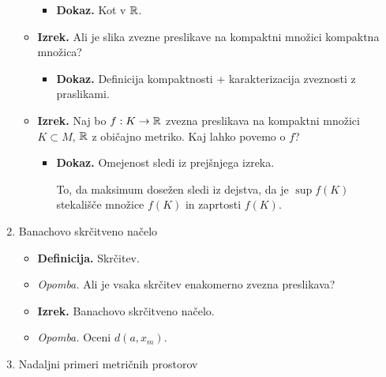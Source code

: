 \begin{enumerate}
\begin{itemize}
\begin{itemize}
            \item \colorbox{green!30}{\textbf{Dokaz.}} Kot v $\mathbb{R}$.
        \end{itemize}        
        \item \colorbox{blue!30}{\textbf{Izrek.}} Ali je slika zvezne preslikave na kompaktni množici kompaktna množica?
        \begin{itemize}
            \item \colorbox{green!30}{\textbf{Dokaz.}} Definicija kompaktnosti + karakterizacija zveznosti z praslikami.
        \end{itemize}  
        \item \colorbox{blue!30}{\textbf{Izrek.}} Naj bo $f: K \to \mathbb{R}$ zvezna preslikava na kompaktni množici $K \subset M$, $\mathbb{R}$ z običajno metriko. Kaj lahko povemo o $f$?
        \begin{itemize}
            \item \colorbox{green!30}{\textbf{Dokaz.}} Omejenost sledi iz prejšnjega izreka. 
            
            To, da maksimum dosežen sledi iz dejstva, da je $\sup f(K)$ stekališče množice $f(K)$ in zaprtosti $f(K)$.
        \end{itemize}  
    \end{itemize}
    \item Banachovo skrčitveno načelo
    \begin{itemize}
        \item \colorbox{purple!30}{\textbf{Definicija.}} Skrčitev.
        \item \colorbox{yellow!30}{\emph{Opomba.}} Ali je vsaka skrčitev enakomerno zvezna preslikava?
        \item \colorbox{blue!30}{\textbf{Izrek.}} Banachovo skrčitveno načelo.
        \item \colorbox{yellow!30}{\emph{Opomba.}} Oceni $d(a, x_m)$.
    \end{itemize}

    \item Nadaljni primeri metričnih prostorov
    

\end{enumerate}

